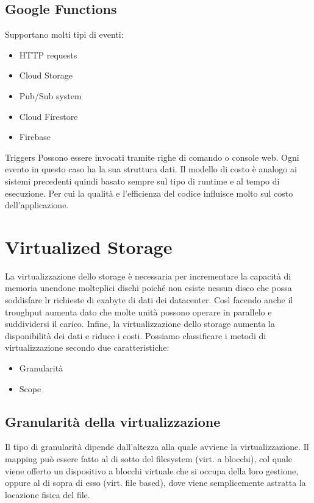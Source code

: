 \documentclass{article}
\begin{document}
		\subsection{Google Functions}
		Supportano molti tipi di eventi:
		\begin{itemize}
		    \item HTTP requests
		    \item Cloud Storage
		    \item Pub/Sub system
		    \item Cloud Firestore
		    \item Firebase
		\end{itemize}
		Triggers
		Possono essere invocati tramite righe di comando o console web.
		Ogni evento in questo caso ha la sua struttura dati.
		Il modello di costo è analogo ai sistemi precedenti quindi basato sempre sul tipo di runtime e al tempo di esecuzione. Per cui la qualità e l'efficienza del codice influisce molto sul costo dell'applicazione. 
		
		\newpage
		\section{Virtualized Storage}
		La virtualizzazione dello storage è necessaria per incrementare la capacità di memoria unendone molteplici dischi poiché non esiste nessun disco che possa soddisfare lr richieste di exabyte di dati dei datacenter. Così facendo anche il troughput aumenta dato che molte unità possono operare in parallelo e suddividersi il carico. Infine, la virtualizzazione dello storage aumenta la disponibilità dei dati e riduce i costi.
		Possiamo classificare i metodi di virtualizzazione secondo due caratteristiche:
		\begin{itemize}
		\item Granularità 
		\item Scope
		\end{itemize}
		
		\subsection{Granularità della virtualizzazione}
		Il tipo di granularità dipende dall’altezza alla quale avviene la virtualizzazione. Il mapping può essere fatto al di sotto del filesystem (virt. a blocchi), col quale viene offerto un dispositivo a blocchi virtuale che si occupa della loro gestione, oppure al di sopra di esso (virt. file based), dove viene semplicemente astratta la locazione fisica del file.
		
\end{document}
